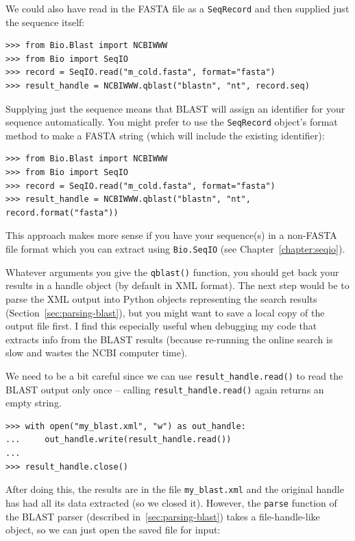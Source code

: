 We could also have read in the FASTA file as a \verb|SeqRecord| and then
supplied just the sequence itself:

\begin{verbatim}
>>> from Bio.Blast import NCBIWWW
>>> from Bio import SeqIO
>>> record = SeqIO.read("m_cold.fasta", format="fasta")
>>> result_handle = NCBIWWW.qblast("blastn", "nt", record.seq)
\end{verbatim}

Supplying just the sequence means that BLAST will assign an identifier
for your sequence automatically.  You might prefer to use the
\verb|SeqRecord| object's format method to make a FASTA string
(which will include the existing identifier):

\begin{verbatim}
>>> from Bio.Blast import NCBIWWW
>>> from Bio import SeqIO
>>> record = SeqIO.read("m_cold.fasta", format="fasta")
>>> result_handle = NCBIWWW.qblast("blastn", "nt", record.format("fasta"))
\end{verbatim}

This approach makes more sense if you have your sequence(s) in a
non-FASTA file format which you can extract using \verb|Bio.SeqIO|
(see Chapter~\ref{chapter:seqio}).

Whatever arguments you give the \verb|qblast()| function, you should
get back your results in a handle object (by default in XML format).
The next step would be to parse the XML output into Python objects
representing the search results (Section~\ref{sec:parsing-blast}),
but you might want to save a local copy of the output file first.
I find this especially useful when debugging my code that extracts
info from the BLAST results (because re-running the online search
is slow and wastes the NCBI computer time).

\label{sec:saving-blast-output}

We need to be a bit careful since we can use \verb|result_handle.read()| to
read the BLAST output only once -- calling \verb|result_handle.read()| again
returns an empty string.

\begin{verbatim}
>>> with open("my_blast.xml", "w") as out_handle:
...     out_handle.write(result_handle.read())
...
>>> result_handle.close()
\end{verbatim}

After doing this, the results are in the file \verb|my_blast.xml| and the
original handle has had all its data extracted (so we closed it). However,
the \verb|parse| function of the BLAST parser (described
in~\ref{sec:parsing-blast}) takes a file-handle-like object, so
we can just open the saved file for input:

